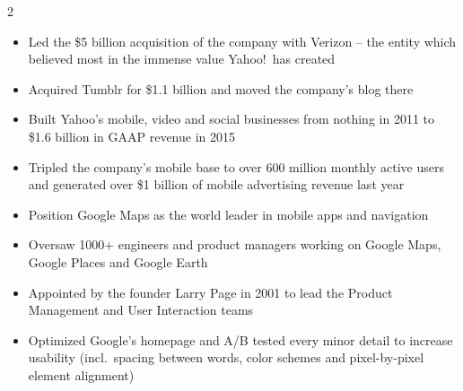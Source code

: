 \documentclass[10pt,a4paper,withhyper]{altacv}
\begin{document}
\begin{paracol}{2}


\begin{itemize}
\item Led the \$5 billion acquisition of the company with Verizon -- the entity which believed most in the immense value Yahoo!\ has created
\item Acquired Tumblr for \$1.1 billion and moved the company's blog there
\item Built Yahoo's mobile, video and social businesses from nothing in 2011 to \$1.6 billion in GAAP revenue in 2015
\item Tripled the company's mobile base to over 600 million monthly active users and generated over \$1 billion of mobile advertising revenue last year
\end{itemize}

\divider

\begin{itemize}
\item Position Google Maps as the world leader in mobile apps and navigation
\item Oversaw 1000+ engineers and product managers working on Google Maps, Google Places and Google Earth
\end{itemize}

\divider


\divider


\begin{itemize}
\item Appointed by the founder Larry Page in 2001 to lead the Product Management and User Interaction teams
\item Optimized Google's homepage and A/B tested every minor detail to increase usability (incl.~spacing between words, color schemes and pixel-by-pixel element alignment)
\end{itemize}



\end{paracol}
\end{document}
